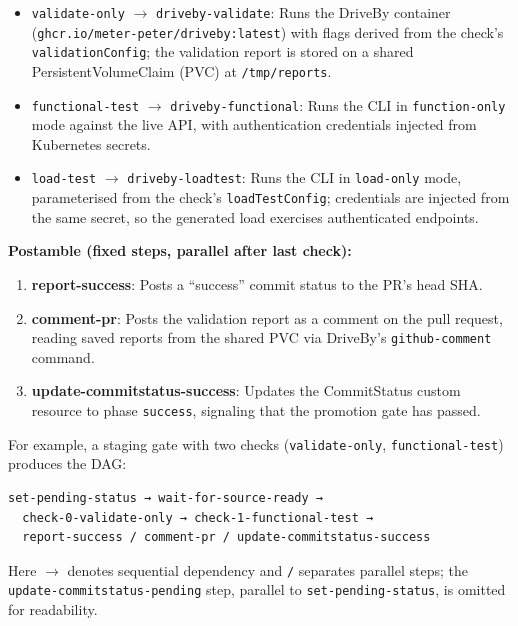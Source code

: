 \begin{itemize}
    \item \texttt{validate-only} $\rightarrow$ \texttt{driveby-validate}: Runs the DriveBy container (\texttt{ghcr.io/\allowbreak meter-peter/\allowbreak driveby:latest}) with flags derived from the check's \texttt{validationConfig}; the validation report is stored on a shared PersistentVolumeClaim (PVC) at \texttt{/tmp/reports}.
    \item \texttt{functional-test} $\rightarrow$ \texttt{driveby-functional}: Runs the CLI in \texttt{function-only} mode against the live API, with authentication credentials injected from Kubernetes secrets.
    \item \texttt{load-test} $\rightarrow$ \texttt{driveby-loadtest}: Runs the CLI in \texttt{load-only} mode, parameterised from the check's \texttt{loadTestConfig}; credentials are injected from the same secret, so the generated load exercises authenticated endpoints.
\end{itemize}

\textbf{Postamble (fixed steps, parallel after last check):}

\begin{enumerate}
    \item \textbf{report-success}: Posts a ``success'' commit status to the PR's head SHA.
    \item \textbf{comment-pr}: Posts the validation report as a comment on the pull request, reading saved reports from the shared PVC via DriveBy's \texttt{github-comment} command.
    \item \textbf{update-commitstatus-success}: Updates the CommitStatus custom resource to phase \texttt{success}, signaling that the promotion gate has passed.
\end{enumerate}

For example, a staging gate with two checks (\texttt{validate-only}, \texttt{functional-test}) produces the DAG:

\begin{verbatim}
set-pending-status → wait-for-source-ready →
  check-0-validate-only → check-1-functional-test →
  report-success / comment-pr / update-commitstatus-success
\end{verbatim}

\noindent
Here $\rightarrow$ denotes sequential dependency and \texttt{/} separates parallel steps; the \texttt{update-commitstatus-pending} step, parallel to \texttt{set-pending-status}, is omitted for readability.

